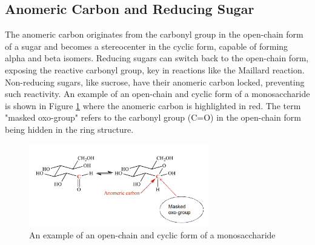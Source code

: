 \subsection*{Anomeric Carbon and Reducing Sugar}
The anomeric carbon originates from the carbonyl group in the open-chain form of a sugar and becomes a stereocenter in the cyclic form, capable of forming alpha and beta isomers. Reducing sugars can switch back to the open-chain form, exposing the reactive carbonyl group, key in reactions like the Maillard reaction. Non-reducing sugars, like sucrose, have their anomeric carbon locked, preventing such reactivity. An example of an open-chain and cyclic form of a monosaccharide is shown in Figure \ref{fig:L02_anomeric_carbon} where the anomeric carbon is highlighted in red. The term "masked oxo-group" refers to the carbonyl group (C=O) in the open-chain form being hidden in the ring structure.
\begin{figure}[h]
    \centering
    \includegraphics[width=0.7\textwidth]{figures/L02_anomeric_carbon.png}
    \caption{An example of an open-chain and cyclic form of a monosaccharide}
    \label{fig:L02_anomeric_carbon}
\end{figure}
